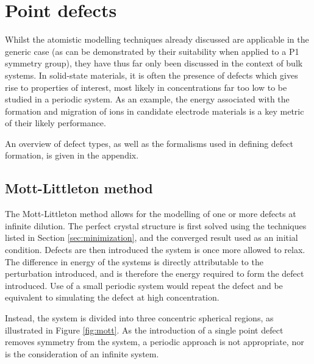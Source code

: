 \section{Point defects}
Whilst the atomistic modelling techniques already discussed are applicable in the generic case (as can be demonstrated by their suitability when applied to a P1 symmetry group), they have thus far only been discussed in the context of bulk systems.
In solid-state materials, it is often the presence of defects which gives rise to properties of interest, most likely in concentrations far too low to be studied in a periodic system.
As an example, the energy associated with the formation and migration of  ions in candidate electrode materials is a key metric of their likely performance.

An overview of defect types, as well as the formalisms used in defining defect formation, is given in the appendix.

\subsection{Mott-Littleton method}
The Mott-Littleton method allows for the modelling of one or more defects at infinite dilution.
The perfect crystal structure is first solved using the techniques listed in Section \ref{sec:minimization}, and the converged result used as an initial condition.
Defects are then introduced the system is once more allowed to relax.
The difference in energy of the systems is directly attributable to the perturbation introduced, and is therefore the energy required to form the defect introduced.
Use of a small periodic system would repeat the defect and be equivalent to simulating the defect at high concentration.

Instead, the system is divided into three concentric spherical regions, as illustrated in Figure \ref{fig:mott}.
As the introduction of a single point defect removes symmetry from the system, a periodic approach is not appropriate, nor is the consideration of an infinite system.

